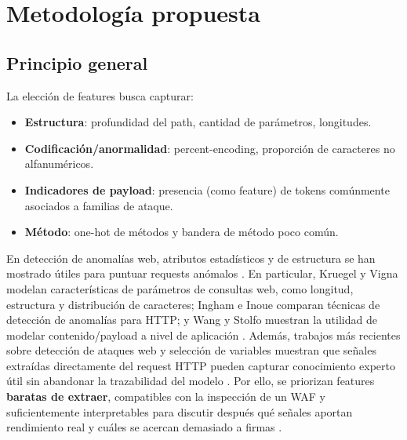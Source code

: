 \documentclass[12pt,oneside]{report}
\begin{document}
\chapter{Metodología propuesta}

\section{Principio general}
La elección de features busca capturar:
\begin{itemize}[leftmargin=*]
  \item \textbf{Estructura}: profundidad del path, cantidad de parámetros, longitudes.
  \item \textbf{Codificación/anormalidad}: percent-encoding, proporción de caracteres no alfanuméricos.
  \item \textbf{Indicadores de payload}: presencia (como feature) de tokens comúnmente asociados a familias de ataque.
  \item \textbf{Método}: one-hot de métodos y bandera de método poco común.
\end{itemize}
En detección de anomalías web, atributos estadísticos y de estructura se han mostrado útiles para puntuar requests anómalos \cite{kruegel_vigna_2003}. En particular, Kruegel y Vigna modelan características de parámetros de consultas web, como longitud, estructura y distribución de caracteres; Ingham e Inoue comparan técnicas de detección de anomalías para HTTP; y Wang y Stolfo muestran la utilidad de modelar contenido/payload a nivel de aplicación \cite{kruegel_vigna_2003,ingham_inoue_2007,wang_stolfo_2004}. Además, trabajos más recientes sobre detección de ataques web y selección de variables muestran que señales extraídas directamente del request HTTP pueden capturar conocimiento experto útil sin abandonar la trazabilidad del modelo \cite{riverol_2024,srbh_paper}. Por ello, se priorizan features \textbf{baratas de extraer}, compatibles con la inspección de un WAF y suficientemente interpretables para discutir después qué señales aportan rendimiento real y cuáles se acercan demasiado a firmas \cite{owasp_waf,modsecurity_site}.
\end{document}
